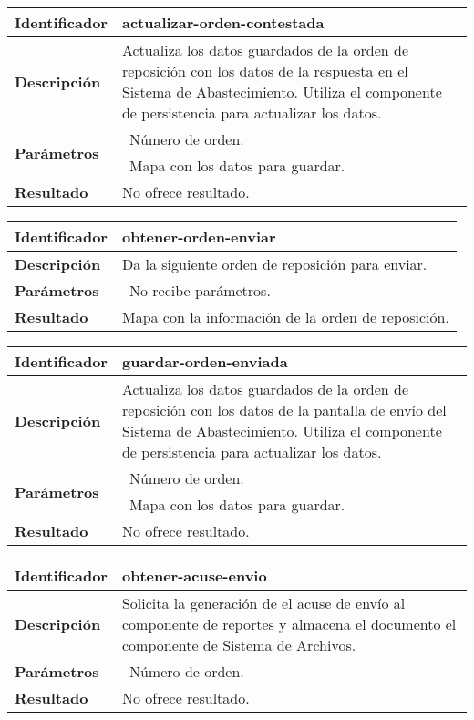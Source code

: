 	\begin{longtable}{|p{}|p{}|}
		\hline
		\textbf{Identificador}	& \textbf{actualizar-orden-contestada}\\
		\hline
		\hline
		\textbf{Descripción}	& Actualiza los datos guardados de la orden de reposición con los datos de la respuesta en el  Sistema de Abastecimiento. Utiliza el componente de persistencia para actualizar los datos.\\
		\hline
		\multirow{2}{*}{\textbf{Parámetros}}	& \textbullet\, Número de orden.\\
												& \textbullet\, Mapa con los datos para guardar.\\
		\hline
		\textbf{Resultado}		& No ofrece resultado.\\
		\hline
	\end{longtable}
	\begin{longtable}{|p{}|p{}|}
		\hline
		\textbf{Identificador}	& \textbf{obtener-orden-enviar}\\
		\hline
		\hline
		\textbf{Descripción}	& Da la siguiente orden de reposición para enviar.\\
		\hline
		\textbf{Parámetros}		& \textbullet\, No recibe parámetros.\\
		\hline
		\textbf{Resultado}		& Mapa con la información de la orden de reposición.\\
		\hline
	\end{longtable}
	\begin{longtable}{|p{}|p{}|}
		\hline
		\textbf{Identificador}	& \textbf{guardar-orden-enviada}\\
		\hline
		\hline
		\textbf{Descripción}	& Actualiza los datos guardados de la orden de reposición con los datos de la pantalla de envío del Sistema de Abastecimiento. Utiliza el componente de persistencia para actualizar los datos.\\
		\hline
		\multirow{2}{*}{\textbf{Parámetros}}	& \textbullet\, Número de orden.\\
												& \textbullet\, Mapa con los datos para guardar.\\
		\hline
		\textbf{Resultado}		& No ofrece resultado.\\
		\hline
	\end{longtable}
	\begin{longtable}{|p{}|p{}|}
		\hline
		\textbf{Identificador}	& \textbf{obtener-acuse-envio}\\
		\hline
		\hline
		\textbf{Descripción}	& Solicita la generación de el acuse de envío al componente de reportes y almacena el documento el componente de Sistema de Archivos.\\
		\hline
		\textbf{Parámetros}		& \textbullet\, Número de orden.\\
		\hline
		\textbf{Resultado}		& No ofrece resultado.\\
		\hline
	\end{longtable}
	\vspace{5mm}
